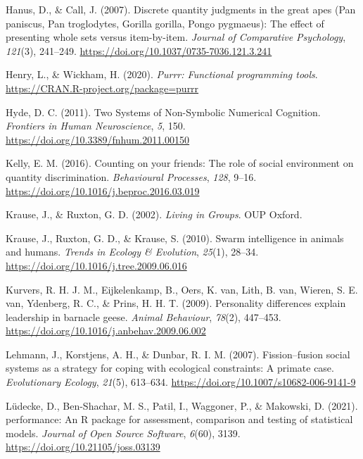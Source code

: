 \documentclass[
  ,doc,floatsintext]{apa6}
\newlength{\cslhangindent}
\newlength{\cslentryspacingunit} %
\newenvironment{CSLReferences}[2] %
 {%
  \setlength{\parindent}{0pt}
  \ifodd #1
  \let\oldpar\par
  \def\par{\hangindent=\cslhangindent\oldpar}
  \fi
  \setlength{\parskip}{#2\cslentryspacingunit}
 }%
 {}
\begin{document}
\begin{CSLReferences}{1}{0}
\leavevmode{}%
Hanus, D., \& Call, J. (2007). Discrete quantity judgments in the great apes ({Pan} paniscus, {Pan} troglodytes, {Gorilla} gorilla, {Pongo} pygmaeus): {The} effect of presenting whole sets versus item-by-item. \emph{Journal of Comparative Psychology}, \emph{121}(3), 241--249. \url{https://doi.org/10.1037/0735-7036.121.3.241}

\leavevmode{}%
Henry, L., \& Wickham, H. (2020). \emph{Purrr: Functional programming tools}. \url{https://CRAN.R-project.org/package=purrr}

\leavevmode{}%
Hyde, D. C. (2011). Two {Systems} of {Non}-{Symbolic} {Numerical} {Cognition}. \emph{Frontiers in Human Neuroscience}, \emph{5}, 150. \url{https://doi.org/10.3389/fnhum.2011.00150}

\leavevmode{}%
Kelly, E. M. (2016). Counting on your friends: {The} role of social environment on quantity discrimination. \emph{Behavioural Processes}, \emph{128}, 9--16. \url{https://doi.org/10.1016/j.beproc.2016.03.019}

\leavevmode{}%
Krause, J., \& Ruxton, G. D. (2002). \emph{Living in {Groups}}. OUP Oxford.

\leavevmode{}%
Krause, J., Ruxton, G. D., \& Krause, S. (2010). Swarm intelligence in animals and humans. \emph{Trends in Ecology \& Evolution}, \emph{25}(1), 28--34. \url{https://doi.org/10.1016/j.tree.2009.06.016}

\leavevmode{}%
Kurvers, R. H. J. M., Eijkelenkamp, B., Oers, K. van, Lith, B. van, Wieren, S. E. van, Ydenberg, R. C., \& Prins, H. H. T. (2009). Personality differences explain leadership in barnacle geese. \emph{Animal Behaviour}, \emph{78}(2), 447--453. \url{https://doi.org/10.1016/j.anbehav.2009.06.002}

\leavevmode{}%
Lehmann, J., Korstjens, A. H., \& Dunbar, R. I. M. (2007). Fission--fusion social systems as a strategy for coping with ecological constraints: A primate case. \emph{Evolutionary Ecology}, \emph{21}(5), 613--634. \url{https://doi.org/10.1007/s10682-006-9141-9}

\leavevmode{}%
Lüdecke, D., Ben-Shachar, M. S., Patil, I., Waggoner, P., \& Makowski, D. (2021). {performance}: An {R} package for assessment, comparison and testing of statistical models. \emph{Journal of Open Source Software}, \emph{6}(60), 3139. \url{https://doi.org/10.21105/joss.03139}


\end{CSLReferences}
\end{document}
